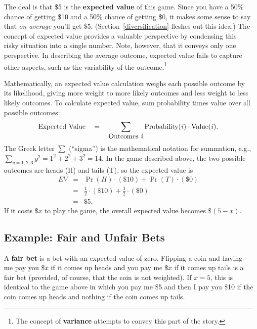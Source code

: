 The deal is that \$5 is the \textbf{expected value} of this game. Since you have a 50\% chance of getting \$10 and a 50\% chance of getting \$0, it makes some sense to say that \emph{on average} you'll get \$5. (Section~\ref{diversification} fleshes out this idea.) The concept of expected value provides a valuable perspective by condensing this risky situation into a single number. Note, however, that it conveys only one perspective. In describing the average outcome, expected value fails to capture other aspects, such as the variability of the outcome.\footnote{The concept of \textbf{variance} attempts to convey this part of the story.}

Mathematically, an expected value calculation weighs each possible outcome by its likelihood, giving more weight to more likely outcomes and less weight to less likely outcomes. To calculate expected value, sum probability times value over all possible outcomes:
\[
\mbox{Expected Value}\ \ \  = \ \ \ \sum_{\mbox{Outcomes
\emph{i}}} \mbox{Probability(\emph{i})} \cdot
\mbox{Value(\emph{i})}.
\]
The Greek letter $\displaystyle \sum$ (``sigma'') is the mathematical notation for summation, e.g., $\displaystyle \sum_{y=1,2,3} y^2 = 1^2+2^2+3^2 = 14$. In the game described above, the two possible outcomes are heads (H) and tails (T), so the expected value is
\begin{eqnarray*}
EV & = & \Pr(H) \cdot (\$10) + \Pr(T) \cdot (\$0) \\
& = & \frac{1}{2}\cdot (\$10) + \frac{1}{2} \cdot (\$0) \\
& = & \$5.
\end{eqnarray*}
If it costs $\$x$ to play the game, the overall expected value becomes $\$(5-x)$.


\subsection*{Example: Fair and Unfair Bets}

A \textbf{fair bet} is a bet with an expected value of zero. Flipping a coin and having me pay you $\$x$ if it comes up heads and you pay me $\$x$ if it comes up tails is a fair bet (provided, of course, that the coin is not weighted). If $x=5$, this is identical to the game above in which you pay me \$5 and then I pay you \$10 if the coin comes up heads and nothing if the coin comes up tails.

